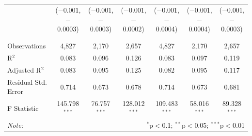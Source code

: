 \documentclass[alpha-refs]{wiley-article-01g}
\begin{document}
\begin{landscape}
\begin{table}[!htbp]
\begin{tabular}{@{\extracolsep{5pt}}lcccccc}
			& ($-$0.001, $-$0.0003) & ($-$0.001, $-$0.0003) & ($-$0.001, $-$0.0002) & ($-$0.001, $-$0.0004) & ($-$0.001, $-$0.0004) & ($-$0.001, $-$0.0003) \\ 
			& & & & & & \\ 
			\hline \\[-.8ex] 
			Observations & 4,827 & 2,170 & 2,657 & 4,827 & 2,170 & 2,657 \\ 
			R$^{2}$ & 0.083 & 0.096 & 0.126 & 0.083 & 0.097 & 0.119 \\ 
			Adjusted R$^{2}$ & 0.083 & 0.095 & 0.125 & 0.082 & 0.095 & 0.117 \\ 
			Residual Std. Error & 0.714 & 0.673 & 0.678 & 0.714 & 0.673 & 0.681 \\ 
			F Statistic & 145.798$^{***}$ & 76.757$^{***}$ & 128.012$^{***}$ & 109.483$^{***}$ & 58.016$^{***}$ & 89.328$^{***}$ \\ 
			\hline 
			\textit{Note:}  & \multicolumn{6}{r}{$^{*}$p$<$0.1; $^{**}$p$<$0.05; $^{***}$p$<$0.01} \\ 
		\end{tabular} 
	\end{table} 
	
\end{landscape}

\newpage
\end{document}
